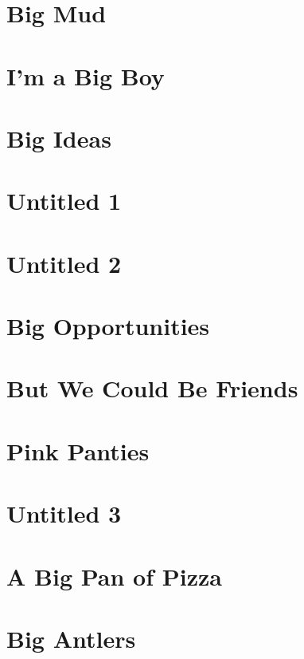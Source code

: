 \chapter{Big Mud}


\chapter{I'm a Big Boy}


\chapter{Big Ideas}


\chapter{Untitled 1}


\chapter{Untitled 2}


\chapter{Big Opportunities}


\chapter{But We Could Be Friends}


\chapter{Pink Panties}


\chapter{Untitled 3}


\chapter{A Big Pan of Pizza}


\chapter{Big Antlers}


